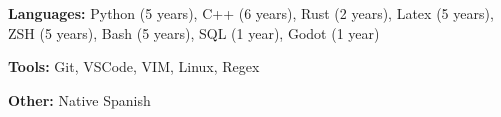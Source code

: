 \documentclass[../main.tex]{subfiles}
\begin{document}
 
 \textbf{Languages:} Python (5 years), C++ (6 years), Rust (2 years), Latex (5 years), ZSH (5 years), Bash (5 years), SQL (1 year), Godot (1 year)

 \textbf{Tools:} Git, VSCode, VIM, Linux, Regex

 \textbf{Other:} Native Spanish 
\end{document}
